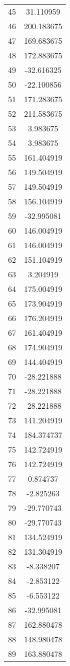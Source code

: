 \documentclass[12pt]{article}
\begin{document}
\begin{longtable}{@{}cc@{}}
45 & 31.110959 \\
46 & 200.183675 \\
47 & 169.683675 \\
48 & 172.883675 \\
49 & -32.616325 \\
50 & -22.100856 \\
51 & 171.283675 \\
52 & 211.583675 \\
53 & 3.983675 \\
54 & 3.983675 \\
55 & 161.404919 \\
56 & 149.504919 \\
57 & 149.504919 \\
58 & 156.104919 \\
59 & -32.995081 \\
60 & 146.004919 \\
61 & 146.004919 \\
62 & 151.104919 \\
63 & 3.204919 \\
64 & 175.004919 \\
65 & 173.904919 \\
66 & 176.204919 \\
67 & 161.404919 \\
68 & 174.904919 \\
69 & 144.404919 \\
70 & -28.221888 \\
71 & -28.221888 \\
72 & -28.221888 \\
73 & 141.204919 \\
74 & 184.374737 \\
75 & 142.724919 \\
76 & 142.724919 \\
77 & 0.874737 \\
78 & -2.825263 \\
79 & -29.770743 \\
80 & -29.770743 \\
81 & 134.524919 \\
82 & 131.304919 \\
83 & -8.338207 \\
84 & -2.853122 \\
85 & -6.553122 \\
86 & -32.995081 \\
87 & 162.880478 \\
88 & 148.980478 \\
89 & 163.880478 \\

\end{longtable}
\end{document}
